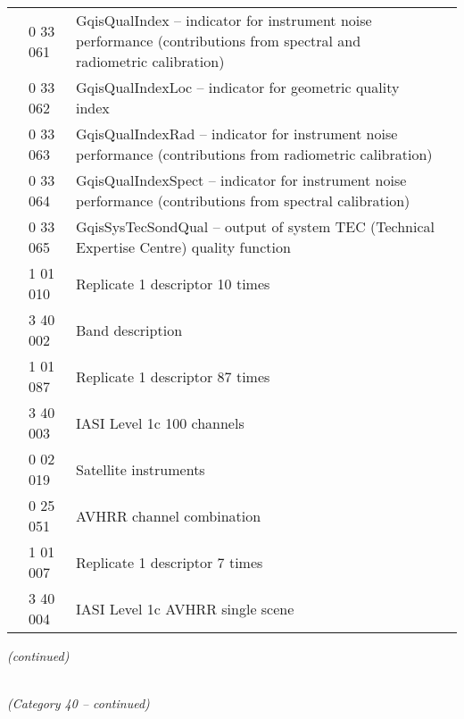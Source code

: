 \begin{longtable}[]{@{}llll@{}}
& 0 33 061 & GqisQualIndex -- indicator for instrument noise performance (contributions from spectral and radiometric calibration) &\tabularnewline
& 0 33 062 & GqisQualIndexLoc -- indicator for geometric quality index &\tabularnewline
& 0 33 063 & GqisQualIndexRad -- indicator for instrument noise performance (contributions from radiometric calibration) &\tabularnewline
& 0 33 064 & GqisQualIndexSpect -- indicator for instrument noise performance (contributions from spectral calibration) &\tabularnewline
& 0 33 065 & GqisSysTecSondQual -- output of system TEC (Technical Expertise Centre) quality function &\tabularnewline
& 1 01 010 & Replicate 1 descriptor 10 times &\tabularnewline
& 3 40 002 & Band description &\tabularnewline
& 1 01 087 & Replicate 1 descriptor 87 times &\tabularnewline
& 3 40 003 & IASI Level 1c 100 channels &\tabularnewline
& 0 02 019 & Satellite instruments &\tabularnewline
& 0 25 051 & AVHRR channel combination &\tabularnewline
& 1 01 007 & Replicate 1 descriptor 7 times &\tabularnewline
& 3 40 004 & IASI Level 1c AVHRR single scene &\tabularnewline
\bottomrule
\end{longtable}

\emph{(continued)}

\emph{\\
(Category 40 -- continued)}

